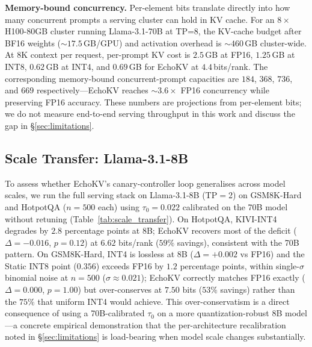 \documentclass{article}
\begin{document}
\textbf{Memory-bound concurrency.} Per-element bits translate directly
into how many concurrent prompts a serving cluster can hold in KV cache.
For an $8\!\times$H100-80GB cluster running Llama-3.1-70B at TP=$8$, the
KV-cache budget after BF16 weights ($\sim$$17.5$\,GB/GPU) and activation
overhead is $\sim$$460$\,GB cluster-wide. At $8$K context per request,
per-prompt KV cost is $2.5$\,GB at FP16, $1.25$\,GB at INT8, $0.62$\,GB
at INT4, and $0.69$\,GB for EchoKV at $4.4$\,bits/rank. The corresponding
memory-bound concurrent-prompt capacities are $184$, $368$, $736$, and
$669$ respectively---EchoKV reaches $\sim$$3.6\times$ FP16 concurrency
while preserving FP16 accuracy. These numbers are projections from
per-element bits; we do not measure end-to-end serving throughput in this
work and discuss the gap in \S\ref{sec:limitations}.

\subsection{Scale Transfer: Llama-3.1-8B}
\label{sec:scale_transfer}

To assess whether EchoKV's canary-controller loop generalises across
model scales, we run the full serving stack on Llama-3.1-8B (TP$=$2) on
GSM8K-Hard and HotpotQA ($n{=}500$ each) using $\tau_0{=}0.022$
calibrated on the 70B model without retuning
(Table~\ref{tab:scale_transfer}). On HotpotQA, KIVI-INT4 degrades by
$2.8$ percentage points at 8B; EchoKV recovers most of the deficit
($\Delta{=}{-}0.016$, $p{=}0.12$) at $6.62$ bits/rank ($59\%$ savings),
consistent with the 70B pattern. On GSM8K-Hard, INT4 is lossless at 8B
($\Delta{=}{+}0.002$ vs FP16) and the Static INT8 point ($0.356$) exceeds
FP16 by $1.2$ percentage points, within single-$\sigma$ binomial noise
at $n{=}500$ ($\sigma{\approx}0.021$); EchoKV correctly matches FP16
exactly ($\Delta{=}0.000$, $p{=}1.00$) but over-conserves at $7.50$ bits
($53\%$ savings) rather than the $75\%$ that uniform INT4 would achieve. This
over-conservatism is a direct consequence of using a 70B-calibrated
$\tau_0$ on a more quantization-robust 8B model---a concrete empirical
demonstration that the per-architecture recalibration noted in
\S\ref{sec:limitations} is load-bearing when model scale changes
substantially.
\end{document}
